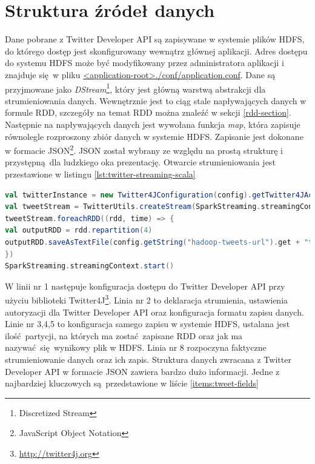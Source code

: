\section{Struktura źródeł danych}\label{sec:tweet-structure}
Dane pobrane z Twitter Developer API są zapisywane w systemie plików HDFS, do którego dostęp jest skonfigurowany wewnątrz głównej aplikacji. Adres dostępu do systemu HDFS może być modyfikowany przez administratora aplikacji i znajduje się w pliku \url{<application-root>./conf/application.conf}. Dane są przyjmowane jako \textit{DStream}\footnote{Discretized Stream}, który jest główną warstwą abstrakcji dla strumieniowania danych. Wewnętrznie jest to ciąg stale napływających danych w formule RDD, szczegóły na temat RDD można znaleźć w sekcji \ref{rdd-section}. Następnie na napływających danych jest wywołana funkcja \textit{map}, która zapisuje równolegle rozproszony zbiór danych w systemie HDFS. Zapisanie jest dokonane w formacie JSON\footnote{JavaScript Object Notation}. JSON został wybrany ze względu na prostą strukturę i przystępną dla ludzkiego oka prezentację. Otwarcie strumieniowania jest przestawione w listingu \ref{lst:twitter-streaming-scala}  
\begin{lstlisting}[language=scala, caption={Otwarcie strumieniowania Twitter Developer API oraz zapis do HDFS},captionpos=b, label={lst:twitter-streaming-scala}]
val twitterInstance = new Twitter4JConfiguration(config).getTwitter4JAccess()
val tweetStream = TwitterUtils.createStream(SparkStreaming.streamingContext, Option(twitterInstance.getAuthorization)).map(new Gson().toJson(_))
tweetStream.foreachRDD((rdd, time) => {
val outputRDD = rdd.repartition(4)
outputRDD.saveAsTextFile(config.getString("hadoop-tweets-url").get + "tweet_" + time.milliseconds.toString)
})
SparkStreaming.streamingContext.start()
\end{lstlisting}
W linii nr 1 następuje konfiguracja dostępu do Twitter Developer API przy użyciu biblioteki Twitter4J\footnote{\url{http://twitter4j.org}}. Linia nr 2 to deklaracja strumienia, ustawienia autoryzacji dla Twitter Developer API oraz konfiguracja formatu zapisu danych. Linie nr 3,4,5 to konfiguracja samego zapisu w systemie HDFS, ustalana jest ilość partycji, na których ma zostać zapisane RDD oraz jak ma nazywać się wynikowy plik w HDFS. Linia nr 8 rozpoczyna faktyczne strumieniowanie danych oraz ich zapis.
\newline Struktura danych zwracana z Twitter Developer API w formacie JSON zawiera bardzo dużo informacji. Jedne z najbardziej kluczowych są przedstawione w liście \ref{items:tweet-fields}
